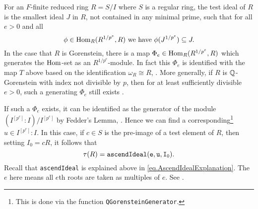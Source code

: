 \documentclass[11pt]{amsart}
\begin{document}
For an $F$-finite reduced ring $R = S/I$ where $S$ is a regular ring, the test ideal of $R$ is the smallest ideal $J$ in $R$, not contained in any minimal prime, such that for all $e > 0$ and all
\[
\phi \in \operatorname{Hom}_R(R^{1/p^e}, R) \text{ we have } \phi(J^{1/p^e}) \subseteq J.
\]
In the case that $R$ is Gorenstein, there is a map $\Phi_e \in \operatorname{Hom}_R(R^{1/p^e}, R)$ which generates the $\operatorname{Hom}$-set as an $R^{1/p^e}$-module.  In fact this $\Phi_e$ is identified with the map $T$ above based on the identification $\omega_R \cong R$, \cite{}.  More generally, if $R$ is $\mathbb{Q}$-Gorenstein with index not divisible by $p$, then for at least sufficiently divisible $e > 0$, such a generating $\Phi_e$ still exists \cite{}.

If such a $\Phi_e$ exists, it can be identified as the generator of the module $(I^{[p^e]} : I) / I^{[p^e]}$ by Fedder's Lemma, \cite{}.  Hence we can find a corresponding\footnote{This is done via the function {\tt QGorensteinGenerator}. } $u \in I^{[p^e]} : I$.  In this case, if $c \in S$ is the pre-image of a test element of $R$, then setting $I_0 = cR$, it follows that
\[
\tau(R) = {\tt ascendIdeal(e, u, I_0)}.
\]
Recall that {\tt ascendIdeal} is explained above in \autoref{eq.AscendIdealExplanation}.  The $e$ here means all $e$th roots are taken as multiples of $e$.  See \cite{}.
\end{document}
